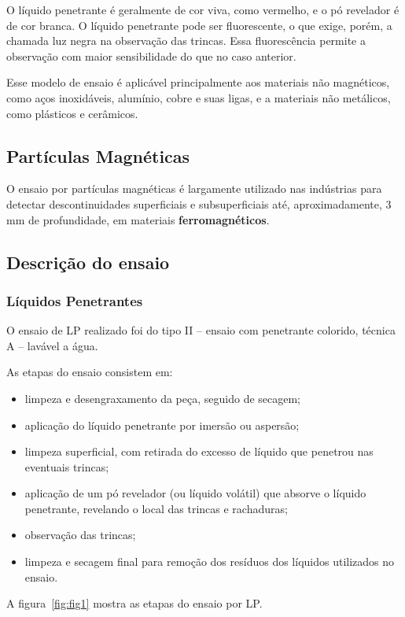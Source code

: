 \documentclass[12pt,oneside]{article}
\begin{document}
O líquido penetrante é geralmente de cor viva, como vermelho, e o pó
revelador é de cor branca. O líquido penetrante pode ser fluorescente,
o que exige, porém, a chamada luz negra na observação das trincas.
Essa fluorescência permite a observação com maior sensibilidade do que
no caso anterior.

Esse modelo de ensaio é aplicável principalmente aos materiais não magnéticos,
como aços inoxidáveis, alumínio, cobre e suas ligas, e a materiais não
metálicos, como plásticos e cerâmicos.

\subsection{Partículas Magnéticas}
\label{sub:pm}

O ensaio por partículas magnéticas é largamente utilizado nas indústrias
para detectar descontinuidades superficiais e subsuperficiais
até, aproximadamente, 3 mm de profundidade, em materiais \textbf{ferromagnéticos}.


\subsection{Descrição do ensaio}

\subsubsection{Líquidos Penetrantes}
O ensaio de LP realizado foi do tipo II -- ensaio com penetrante colorido,
técnica A -- lavável a água.

As etapas do ensaio consistem em:
\begin{itemize}[label={--}]
    \item limpeza e desengraxamento da peça, seguido de secagem;
    \item aplicação do líquido penetrante por imersão ou aspersão;
    \item limpeza superficial, com retirada do excesso de líquido
        que penetrou nas eventuais trincas;
    \item aplicação de um pó revelador (ou líquido volátil) que absorve
        o líquido penetrante, revelando o local das trincas e rachaduras;
    \item observação das trincas;
    \item limpeza e secagem final para remoção dos resíduos dos líquidos utilizados no ensaio.
\end{itemize}
A figura~\ref{fig:fig1} mostra as etapas do ensaio por LP.
\end{document}
